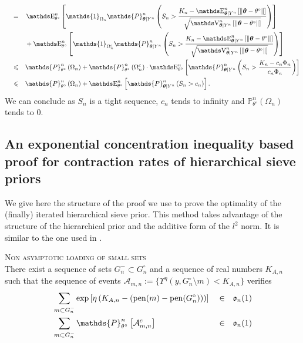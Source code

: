 \begin{pro}
\begin{alignat*}{3}
& && = && \E_{\theta^{\circ}}^{n}\left[\mathds{1}_{\Omega_{n}}\mathds{P}^{n}_{\boldsymbol{\theta} \vert Y^{n}}\left(S_{n} > \frac{K_{n} - \E^{n}_{\boldsymbol{\theta} \vert Y^{n}}\left[\Vert \boldsymbol{\theta} - \theta^{\circ} \Vert\right]}{\sqrt{\V^{n}_{\boldsymbol{\theta} \vert Y^{n}}\left[\Vert \boldsymbol{\theta} - \theta^{\circ} \Vert\right]}} \right)\right]\\
& && && + \E_{\theta^{\circ}}^{n}\left[\mathds{1}_{\Omega_{n}^{c}}\mathds{P}^{n}_{\boldsymbol{\theta} \vert Y^{n}}\left(S_{n} > \frac{K_{n} - \E^{n}_{\boldsymbol{\theta} \vert Y^{n}}\left[\Vert \boldsymbol{\theta} - \theta^{\circ} \Vert\right]}{\sqrt{\V^{n}_{\boldsymbol{\theta} \vert Y^{n}}\left[\Vert \boldsymbol{\theta} - \theta^{\circ} \Vert\right]}} \right)\right]\\
& && \leq && \mathds{P}_{\theta^{\circ}}^{n}\left(\Omega_{n}\right) + \mathds{P}^{n}_{\theta^{\circ}}\left(\Omega_{n}^{c}\right) \cdot \E_{\theta^{\circ}}^{n}\left[\mathds{P}^{n}_{\boldsymbol{\theta} \vert Y^{n}}\left(S_{n} > \frac{K_{n} - c_{n} \Phi_{n}}{c_{n} \Phi_{n}} \right)\right]\\
& && \leq && \mathds{P}_{\theta^{\circ}}^{n}\left(\Omega_{n}\right) + \E_{\theta^{\circ}}^{n}\left[\mathds{P}^{n}_{\boldsymbol{\theta} \vert Y^{n}}\left(S_{n} > c_{n} \right)\right].
\end{alignat*}
We can conclude as $S_{n}$ is a tight sequence, $c_{n}$ tends to infinity and $\mathds{P}_{\theta^{\circ}}^{n}\left(\Omega_{n}\right)$ tends to $0$.
\qedsymbol
\end{pro}

\subsection{An exponential concentration inequality based proof for contraction rates of hierarchical sieve priors}\label{BAYES_STRATEGIES_EXPO}

We give here the structure of the proof we use to prove the optimality of the (finally) iterated hierarchical sieve prior.
This method takes advantage of the structure of the hierarchical prior and the additive form of the $l^{2}$ norm.
It is similar to the one used in .

\begin{as}{\textsc{Non asymptotic loading of small sets} \\}\label{AS_BAYES_STRATEGIES_EXPO_SMALLSET}
There exist a sequence of sets $G^{-}_{n} \subset G^{\circ}_{n}$ and a sequence of real numbers $K_{A, n}$ such that the sequence of events $\mathcal{A}_{m, n} := \{\Upsilon^{\eta}(y, G^{\circ}_{n} \setminus m) < K_{A, n}\}$ verifies
\begin{alignat*}{3}
& \sum\limits_{m \subset G^{-}_{n}} \exp\left[\eta\left(K_{A, n} - (\pen(m) - \pen(G^{\circ}_{n}))\right)\right] && \in && \mathfrak{o}_{n}(1)\\
& \sum\limits_{m \subset G^{-}_{n}}\mathds{P}_{\theta^{\circ}}^{n}\left[ \mathcal{A}_{m, n}^{c}\right] && \in && \mathfrak{o}_{n}(1)\\
\end{alignat*}
\end{as}

